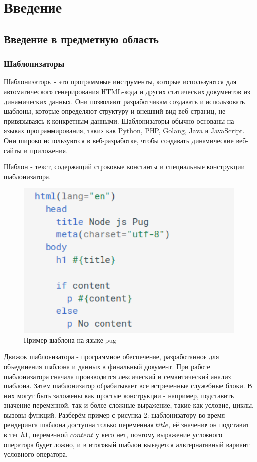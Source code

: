 \documentclass[a4paper]{article}
\begin{document}
\newpage
\section{Введение}

\subsection{Введение в предметную область}

\subsubsection{Шаблонизаторы}
\indent
Шаблонизаторы - это программные инструменты, которые используются для автоматического генерирования HTML-кода и других статических документов из динамических данных. Они позволяют разработчикам создавать и использовать шаблоны, которые определяют структуру и внешний вид веб-страниц, не привязываясь к конкретным данными. Шаблонизаторы обычно основаны на языках программирования, таких как Python, PHP, Golang, Java и JavaScript. Они широко используются в веб-разработке, чтобы создавать динамические веб-сайты и приложения.

Шаблон - текст, содержащий строковые константы и специальные конструкции шаблонизатора.

\begin{figure}[ht!]
\includegraphics[width=140mm]{PugExample.png}
\caption{Пример шаблона на языке pug}
\label{PugTemplateExample}
\end{figure}

Движок шаблонизатора - программное обеспечение, разработанное для объединения шаблона и данных в финальный документ. При работе шаблонизатора сначала производится лексический и семантический анализ шаблона. Затем шаблонизатор обрабатывает все встреченные служебные блоки. В них могут быть заложены как простые конструкции - например, подставить значение переменной, так и более сложные выражение, такие как условие, циклы, вызовы функций. Разберём пример с рисунка 2: шаблонизатору во время рендеринга шаблона доступна только переменная $title$, её значение он подставит в тег $h1$, переменной $content$ у него нет, поэтому выражение условного оператора будет ложно, и в итоговый шаблон выведется альтернативный вариант условного оператора.
\end{document}
